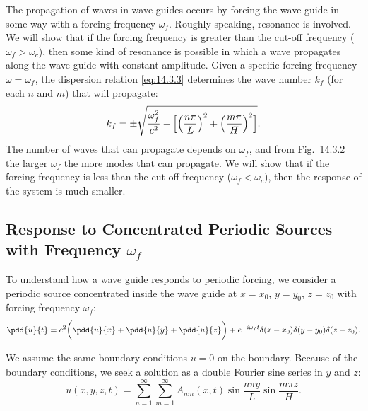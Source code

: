 The propagation of waves in wave guides occurs by forcing the wave guide in some way with a forcing frequency $\omega_f$.  Roughly speaking, resonance is involved.  We will show that if the forcing frequency is greater than the cut-off frequency ($\omega_f > \omega_c$), then some kind of resonance is possible in which a wave propagates along the wave guide with constant amplitude.  Given a specific forcing frequency $\omega = \omega_f$, the dispersion relation \eqref{eq:14.3.3} determines the wave number $k_f$ (for each $n$ and $m$) that will propagate:
\[
k_f = \pm\sqrt{\frac{\omega_f^2}{c^2} - \Bigl[\Bigl(\frac{n\pi}{L}\Bigr)^2 + \Bigl(\frac{m\pi}{H}\Bigr)^2\Bigr]}.
\]
The number of waves that can propagate depends on $\omega_f$, and from Fig.~14.3.2 the larger $\omega_f$ the more modes that can propagate.  We will show that if the forcing frequency is less than the cut-off frequency ($\omega_f < \omega_c$), then the response of the system is much smaller.

\subsection{Response to Concentrated Periodic Sources with Frequency $\omega_f$}
\label{sec:wave-guide-periodic-source}

To understand how a wave guide responds to periodic forcing, we consider a periodic source concentrated inside the wave guide at $x = x_0$, $y = y_0$, $z = z_0$ with forcing frequency $\omega_f$:
\begin{equation}
\label{eq:14.3.5}
\pdd{u}{t} = c^2\biggl(\pdd{u}{x} + \pdd{u}{y} + \pdd{u}{z}\biggr) + e^{-i\omega_f t}\delta(x - x_0)\delta(y - y_0)\delta(z - z_0).
\end{equation}

We assume the same boundary conditions $u = 0$ on the boundary.  Because of the boundary conditions, we seek a solution as a double Fourier sine series in $y$ and $z$:
\begin{equation}
\label{eq:14.3.6}
u(x,y,z,t) = \sum_{n=1}^{\infty}\sum_{m=1}^{\infty} A_{nm}(x,t)\sin\frac{n\pi y}{L}\sin\frac{m\pi z}{H}.
\end{equation}

